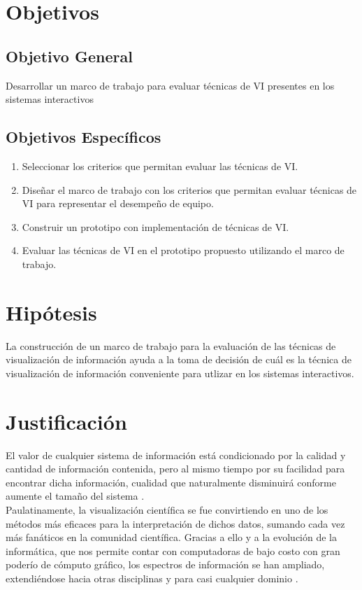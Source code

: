 \section{Objetivos}
\subsection{Objetivo General}
Desarrollar un  marco de trabajo para  evaluar técnicas de VI presentes en los sistemas interactivos
\subsection{Objetivos Específicos}
\begin{enumerate}
\item Seleccionar los criterios que permitan evaluar las técnicas de VI.
\item Diseñar el marco de trabajo con los criterios que permitan evaluar  técnicas de VI para representar el desempeño de equipo.
\item Construir un prototipo con implementación de  técnicas de VI.
\item Evaluar  las técnicas de VI en el prototipo propuesto utilizando el marco de trabajo.
\end{enumerate}

\section{Hipótesis}
La construcción de un marco de trabajo para la evaluación de las técnicas de visualización de información ayuda a la toma de decisión de cuál es la técnica de visualización de información conveniente para utlizar en los sistemas interactivos.

\section{Justificación}
El valor de cualquier sistema de información está condicionado por la calidad y cantidad de información contenida, pero al mismo tiempo por su facilidad para encontrar dicha información, cualidad que naturalmente disminuirá conforme aumente el tamaño del sistema \cite{montero}.
\\Paulatinamente, la visualización científica se fue convirtiendo en uno de los métodos más eficaces para la interpretación de dichos datos, sumando cada vez más fanáticos en la comunidad científica. Gracias a ello y a la evolución de la informática, que nos permite contar con computadoras de bajo costo con gran poderío de cómputo gráfico, los espectros de información se han ampliado, extendiéndose hacia otras disciplinas y para casi cualquier dominio \cite{padua}.